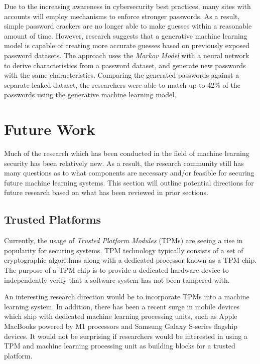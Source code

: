 \documentclass[11pt,conference]{IEEEtran}
\begin{document}
Due to the increasing awareness in cybersecurity best practices, many sites
with accounts will employ mechanisms to enforce stronger passwords. As a
result, simple password crackers are no longer able to make guesses 
within a reasonable amount of time. However, research suggests that a
generative machine learning model is capable of creating more accurate guesses
based on previously exposed password datasets. The approach uses the
\emph{Markov Model} with a neural network to derive characteristics from a
password dataset, and generate new passwords with the same characteristics.
Comparing the generated passwords against a separate leaked dataset, the
researchers were able to match up to 42\% of the passwords using the generative
machine learning model.

\section{Future Work}
Much of the research which has been conducted in the field of machine learning
security has been relatively new. As a result, the research community still has
many questions as to what components are necessary and/or feasible for securing
future machine learning systems.
This section will outline potential directions for future research based on
what has been reviewed in prior sections.

\subsection{Trusted Platforms}
Currently, the usage of \emph{Trusted Platform Modules} (TPMs) are seeing a
rise in popularity for securing systems. TPM technology typically consists of a
set of cryptographic algorithms along with a dedicated processor known as a TPM
chip. The purpose of a TPM chip is to provide a dedicated hardware device to
independently verify that a software system has not been tampered with. 

An interesting research direction would be to incorporate TPMs into a machine
learning system. In addition, there has been a recent surge in mobile devices
which ship with dedicated machine learning processing units, such as Apple
MacBooks powered by M1 processors and Samsung Galaxy S-series flagship devices.
It would not be surprising if researchers would be interested in using a TPM
and machine learning processing unit as building blocks for a trusted platform.
\end{document}

